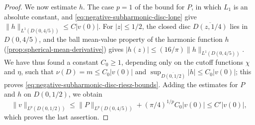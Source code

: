\begin{proof}
We now estimate $h$. The case $p=1$ of the bound for $P$, in which $L_1$ is an absolute constant, and \eqref{eq:negative-subharmonic-disc-lone} give $\|h\|_{L^1(D(0,4/5))}\leq C|v(0)|$. For $|z|\leq1/2$, the closed disc $\overline{D(z,1/4)}$ lies in $D(0,4/5)$, and the ball mean-value property of the harmonic function $h$ (\cref{prop:spherical-mean-derivative}) gives $|h(z)|\leq(16/\pi)\|h\|_{L^1(D(0,4/5))}$. We have thus found a constant $C_0\geq1$, depending only on the cutoff functions $\chi$ and $\eta$, such that $\nu(D)=m\leq C_0|v(0)|$ and $\sup_{\overline{D(0,1/2)}}|h|\leq C_0|v(0)|$; this proves \eqref{eq:negative-subharmonic-disc-riesz-bounds}. Adding the estimates for $P$ and $h$ on $D(0,1/2)$, we obtain
\[
 \|v\|_{L^p(D(0,1/2))}\leq\|P\|_{L^p(D(0,4/5))}+(\pi/4)^{1/p}C_0|v(0)|\leq C'|v(0)|,
\]
which proves the last assertion.
\end{proof}

